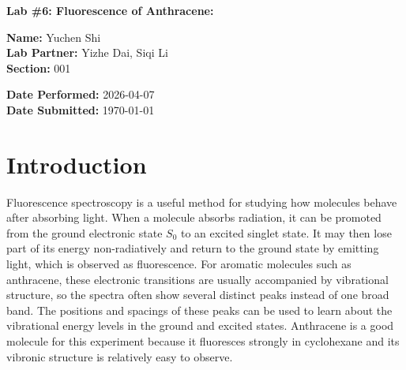 \documentclass[12pt]{article}
\begin{document}
\begin{center}
    \Large \textbf{Lab \#6: Fluorescence of Anthracene:}\\[0.2em]
\end{center}
\vspace{0.5em}

\noindent
\begin{minipage}[t]{0.5\textwidth}
    \small
    \textbf{Name:} Yuchen Shi \\
    \textbf{Lab Partner:} Yizhe Dai, Siqi Li \\
    \textbf{Section:} 001
\end{minipage}%
\begin{minipage}[t]{0.5\textwidth}
    \small \raggedleft
    \textbf{Date Performed:} 2026-04-07 \\
    \textbf{Date Submitted:} \today
\end{minipage}
\vspace{1.5em}

\begin{abstract}
Anthracene fluorescence in cyclohexane was measured with a spectrometer to examine vibronic structure and quenching phenomena with ethyl iodide. Emission spectra were recorded at excitation wavelengths of 340 and 325 nm, an excitation spectrum was acquired by monitoring emission at 425 nm. Quenching spectra were measured for 0.050 M, 0.100 M, 0.150 M, and 0.200 M ethyl iodide. Emission and excitation peak spacings showed average apparent vibrational spacings of 1382.561 $\pm$ 16.321 cm$^{-1}$ for $S_0$ and 1427.825 $\pm$ 27.260 cm$^{-1}$ for $S_1$. Four Stern-Volmer fits yielded an average quenching constant of $K_{SV}=18.500 \pm 0.110$ M$^{-1}$ with 95\% confidence interval and an apparent bimolecular quenching constant of $(3.830 \pm 0.023)\times10^9$ M$^{-1}$ s$^{-1}$. The experimental $K_{SV}$ agreed well with literature values of 18.800 and 19.100 M$^{-1}$, differing by 1.596\% and 3.141\%, respectively.
\end{abstract}

\section*{Introduction}
Fluorescence spectroscopy is a useful method for studying how molecules behave after absorbing light. When a molecule absorbs radiation, it can be promoted from the ground electronic state $S_0$ to an excited singlet state. It may then lose part of its energy non-radiatively and return to the ground state by emitting light, which is observed as fluorescence. For aromatic molecules such as anthracene, these electronic transitions are usually accompanied by vibrational structure, so the spectra often show several distinct peaks instead of one broad band. The positions and spacings of these peaks can be used to learn about the vibrational energy levels in the ground and excited states. Anthracene is a good molecule for this experiment because it fluoresces strongly in cyclohexane and its vibronic structure is relatively easy to observe.
\end{document}
